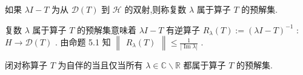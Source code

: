 \documentclass[lang=cn,newtx,10pt,scheme=chinese,thmcnt=chapter]{elegantbook}
\renewcommand{\Im}{\operatorname{Im}}
\begin{document}
\begin{definition}
    如果 \({\lambda I} - T\) 为从 \(\mathcal{D}(T)\) 到 \(\mathcal{H}\) 的双射,则称复数 \(\lambda\) 属于算子 \(T\) 的预解集.
\end{definition}
\begin{note}
    复数 \(\lambda\) 属于算子 \(T\) 的预解集意味着 \({\lambda I} - T\) 有逆算子 \({R}_{\lambda }\left( T\right)  \mathrel{\text{ := }} {\left( \lambda I - T\right) }^{-1}\) : \(H \rightarrow  \mathcal{D}(T)\) . 由命题 5.1 知 \(\begin{Vmatrix}{{R}_{\lambda }\left( T\right) }\end{Vmatrix} \leq  \frac{1}{\left| \Im\lambda \right| }\) .

\end{note}

\begin{theorem}
    闭对称算子 \(T\) 为自伴的当且仅当所有 \(\lambda  \in  \mathbb{C} \smallsetminus  \mathbb{R}\) 都属于算子 \(T\) 的预解集.
\end{theorem}
\end{document}
